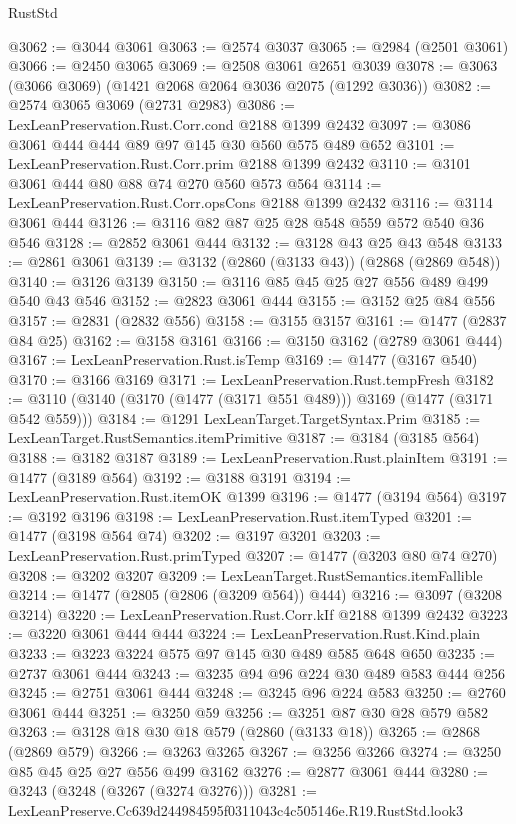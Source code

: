 \begin{lexlean}{RustStd}
\begin{coremodule}
@3062 := @3044 @3061
@3063 := @2574 @3037
@3065 := @2984 (@2501 @3061)
@3066 := @2450 @3065
@3069 := @2508 @3061 @2651 @3039
@3078 := @3063 (@3066 @3069) (@1421 @2068 @2064 @3036 @2075 (@1292 @3036))
@3082 := @2574 @3065 @3069 (@2731 @2983)
@3086 := LexLeanPreservation.Rust.Corr.cond @2188 @1399 @2432
@3097 := @3086 @3061 @444 @444 @89 @97 @145 @30 @560 @575 @489 @652
@3101 := LexLeanPreservation.Rust.Corr.prim @2188 @1399 @2432
@3110 := @3101 @3061 @444 @80 @88 @74 @270 @560 @573 @564
@3114 := LexLeanPreservation.Rust.Corr.opsCons @2188 @1399 @2432
@3116 := @3114 @3061 @444
@3126 := @3116 @82 @87 @25 @28 @548 @559 @572 @540 @36 @546
@3128 := @2852 @3061 @444
@3132 := @3128 @43 @25 @43 @548
@3133 := @2861 @3061
@3139 := @3132 (@2860 (@3133 @43)) (@2868 (@2869 @548))
@3140 := @3126 @3139
@3150 := @3116 @85 @45 @25 @27 @556 @489 @499 @540 @43 @546
@3152 := @2823 @3061 @444
@3155 := @3152 @25 @84 @556
@3157 := @2831 (@2832 @556)
@3158 := @3155 @3157
@3161 := @1477 (@2837 @84 @25)
@3162 := @3158 @3161
@3166 := @3150 @3162 (@2789 @3061 @444)
@3167 := LexLeanPreservation.Rust.isTemp
@3169 := @1477 (@3167 @540)
@3170 := @3166 @3169
@3171 := LexLeanPreservation.Rust.tempFresh
@3182 := @3110 (@3140 (@3170 (@1477 (@3171 @551 @489))) @3169 (@1477 (@3171 @542 @559)))
@3184 := @1291 LexLeanTarget.TargetSyntax.Prim
@3185 := LexLeanTarget.RustSemantics.itemPrimitive
@3187 := @3184 (@3185 @564)
@3188 := @3182 @3187
@3189 := LexLeanPreservation.Rust.plainItem
@3191 := @1477 (@3189 @564)
@3192 := @3188 @3191
@3194 := LexLeanPreservation.Rust.itemOK @1399
@3196 := @1477 (@3194 @564)
@3197 := @3192 @3196
@3198 := LexLeanPreservation.Rust.itemTyped
@3201 := @1477 (@3198 @564 @74)
@3202 := @3197 @3201
@3203 := LexLeanPreservation.Rust.primTyped
@3207 := @1477 (@3203 @80 @74 @270)
@3208 := @3202 @3207
@3209 := LexLeanTarget.RustSemantics.itemFallible
@3214 := @1477 (@2805 (@2806 (@3209 @564)) @444)
@3216 := @3097 (@3208 @3214)
@3220 := LexLeanPreservation.Rust.Corr.kIf @2188 @1399 @2432
@3223 := @3220 @3061 @444 @444
@3224 := LexLeanPreservation.Rust.Kind.plain
@3233 := @3223 @3224 @575 @97 @145 @30 @489 @585 @648 @650
@3235 := @2737 @3061 @444
@3243 := @3235 @94 @96 @224 @30 @489 @583 @444 @256
@3245 := @2751 @3061 @444
@3248 := @3245 @96 @224 @583
@3250 := @2760 @3061 @444
@3251 := @3250 @59
@3256 := @3251 @87 @30 @28 @579 @582
@3263 := @3128 @18 @30 @18 @579 (@2860 (@3133 @18))
@3265 := @2868 (@2869 @579)
@3266 := @3263 @3265
@3267 := @3256 @3266
@3274 := @3250 @85 @45 @25 @27 @556 @499 @3162
@3276 := @2877 @3061 @444
@3280 := @3243 (@3248 (@3267 (@3274 @3276)))
@3281 := LexLeanPreserve.Cc639d244984595f0311043c4c505146e.R19.RustStd.look3

\end{coremodule}
\end{lexlean}
